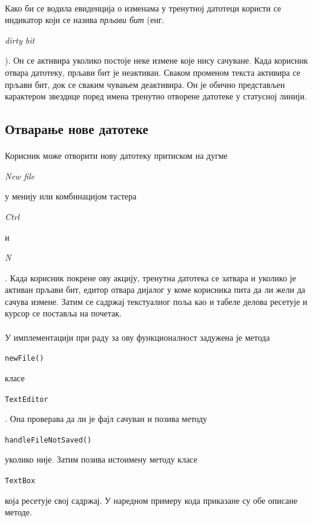 \documentclass[12pt,oneside]{memoir}
\begin{document}
\paragraph{}
Како би се водила евиденција о изменама у тренутној датотеци користи
се индикатор који се назива \emph{прљави бит} (енг. \begin{latinica}\textit{dirty bit}\end{latinica}). Он се активира уколико постоје неке измене које нису сачуване.
Када корисник отвара датотеку, прљави бит је неактиван.
Сваком променом текста активира се прљави бит, док се сваким
чувањем деактивира. Он је обично представљен карактером звездице поред
имена тренутно отворене датотеке у статусној линији.

\subsection{Отварање нове датотеке}
\paragraph{}
Корисник може отворити нову датотеку притиском на дугме 
\begin{latinica}\textit{New file}\end{latinica} у менију или комбинацијом тастера
\begin{latinica}\textit{Ctrl}\end{latinica} и
\begin{latinica}\textit{N}\end{latinica}. Када корисник покрене ову акцију,
тренутна датотека се затвара и уколико је активан прљави бит, едитор отвара
дијалог у коме корисника пита да ли жели да сачува измене. Затим се садржај
текстуалног поља као и табеле делова ресетује и курсор се поставља на почетак.

\paragraph{}
У имплементацији при раду за ову функционалност задужена је метода
\begin{latinica}\verb|newFile()|\end{latinica} класе
\begin{latinica}\verb|TextEditor|\end{latinica}. Она проверава да ли је фајл
сачуван и позива методу
\begin{latinica}\verb|handleFileNotSaved()|\end{latinica} 
уколико није. Затим позива истоимену методу класе \begin{latinica}\verb|TextBox|\end{latinica} која ресетује свој садржај.
У наредном примеру кода приказане су обе описане методе.
\end{document}
